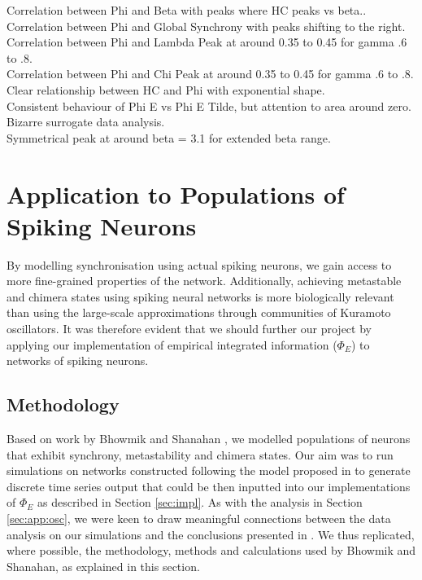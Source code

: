 \documentclass[a4paper,11pt]{article}
\begin{document}
Correlation between Phi and Beta with peaks where HC peaks vs beta..\\
Correlation between Phi and Global Synchrony with peaks shifting to the right.\\
Correlation between Phi and Lambda Peak at around 0.35 to 0.45 for gamma .6 to .8.\\
Correlation between Phi and Chi Peak at around 0.35 to 0.45 for gamma .6 to .8.\\
Clear relationship between HC and Phi with exponential shape.\\
Consistent behaviour of Phi E vs Phi E Tilde, but attention to area around zero.\\
Bizarre surrogate data analysis.\\
Symmetrical peak at around beta = 3.1 for extended beta range.

\clearpage

\section{Application to Populations of Spiking Neurons}
\label{MSUSNN}
By modelling synchronisation using actual spiking neurons, we gain access to more fine-grained properties of the network. Additionally, achieving metastable and chimera states using spiking neural networks is more biologically relevant than using the large-scale approximations through communities of Kuramoto oscillators. It was therefore evident that we should further our project by applying our implementation of empirical integrated information ($\Phi_E$) to networks of spiking neurons.

\subsection{Methodology}
\label{sec:snn:methods}

Based on work by Bhowmik and Shanahan \cite{Bhowmik2013}, we modelled populations of neurons that exhibit synchrony, metastability and chimera states. Our aim was to run simulations on networks constructed following the model proposed in \cite{Bhowmik2013} to generate discrete time series output that could be then inputted into our implementations of $\Phi_E$ as described in Section \ref{sec:impl}. As with the analysis in Section \ref{sec:app:osc}, we were keen to draw meaningful connections between the data analysis on our simulations and the conclusions presented in \cite{Bhowmik2013}. We thus replicated, where possible, the methodology, methods and calculations used by Bhowmik and Shanahan, as explained in this section.
\end{document}
